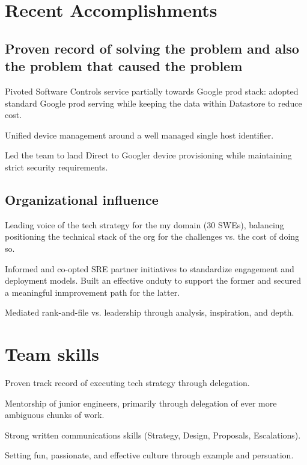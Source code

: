 \documentclass{resume}
\newcommand{\textapprox}{\raisebox{0.5ex}{\texttildelow}}
\begin{document}
\author{Dmitry Ratnikov}
\phone{}
\streetaddress{ }
\maketitle

\section{Recent Accomplishments}

\subsection{Proven record of solving the problem and also the problem that caused the problem}

\begin{compactitem}
\item Pivoted Software Controls service partially towards Google prod stack: adopted standard Google prod serving while keeping the data within Datastore to reduce cost.
\item Unified device management around a well managed single host identifier.
\item Led the team to land Direct to Googler device provisioning while maintaining strict security requirements.
\end{compactitem}

\subsection{Organizational influence}
\begin{compactitem}
\item Leading voice of the tech strategy for the my domain (\textapprox 30 SWEs), balancing positioning the technical stack of the org for the challenges vs. the cost of doing so.
\item Informed and co-opted SRE partner initiatives to standardize engagement and deployment models. Built an effective onduty to support the former and secured a meaningful inmprovement path for the latter.
\item Mediated rank-and-file vs. leadership through analysis, inspiration, and depth.
\end{compactitem}

\section{Team skills}
\begin{compactitem}
\item Proven track record of executing tech strategy through delegation.
\item Mentorship of junior engineers, primarily through delegation of ever more ambiguous chunks of work.
\item Strong written communications skills (Strategy, Design, Proposals, Escalations).
\item Setting fun, passionate, and effective culture through example and persuation.
\end{compactitem}
\end{document}
